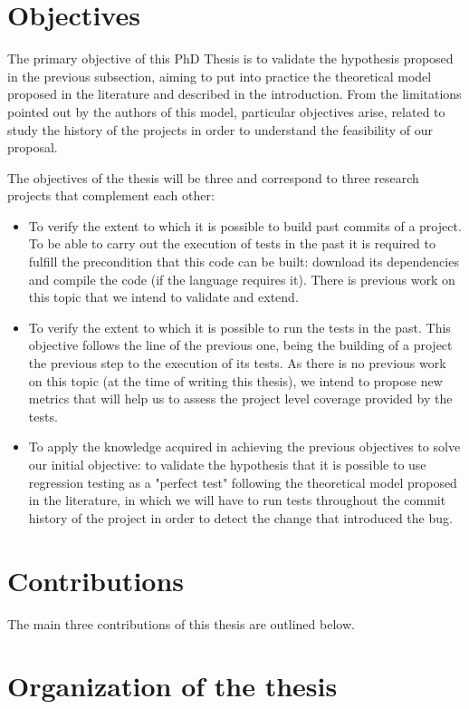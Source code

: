 \section{Objectives}

The primary objective of this PhD Thesis is to validate the hypothesis proposed in the previous subsection, aiming to put into practice the theoretical model proposed in the literature and described in the introduction. 
From the limitations pointed out by the authors of this model, particular objectives arise, related to study the history of the projects in order to understand the feasibility of our proposal.

The objectives of the thesis will be three and correspond to three research projects that complement each other:

\begin{itemize}
    \item To verify the extent to which it is possible to build past commits of a project. To be able to carry out the execution of tests in the past it is required to fulfill the precondition that this code can be built: download its dependencies and compile the code (if the language requires it). There is previous work on this topic that we intend to validate and extend.
    \item To verify the extent to which it is possible to run the tests in the past. This objective follows the line of the previous one, being the building of a project the previous step to the execution of its tests. As there is no previous work on this topic (at the time of writing this thesis), we intend to propose new metrics that will help us to assess the project level coverage provided by the tests.
    \item To apply the knowledge acquired in achieving the previous objectives to solve our initial objective: to validate the hypothesis that it is possible to use regression testing as a "perfect test" following the theoretical model proposed in the literature, in which we will have to run tests throughout the commit history of the project in order to detect the change that introduced the bug.
\end{itemize}

\section{Contributions}

The main three contributions of this thesis are outlined below.

\section{Organization of the thesis}